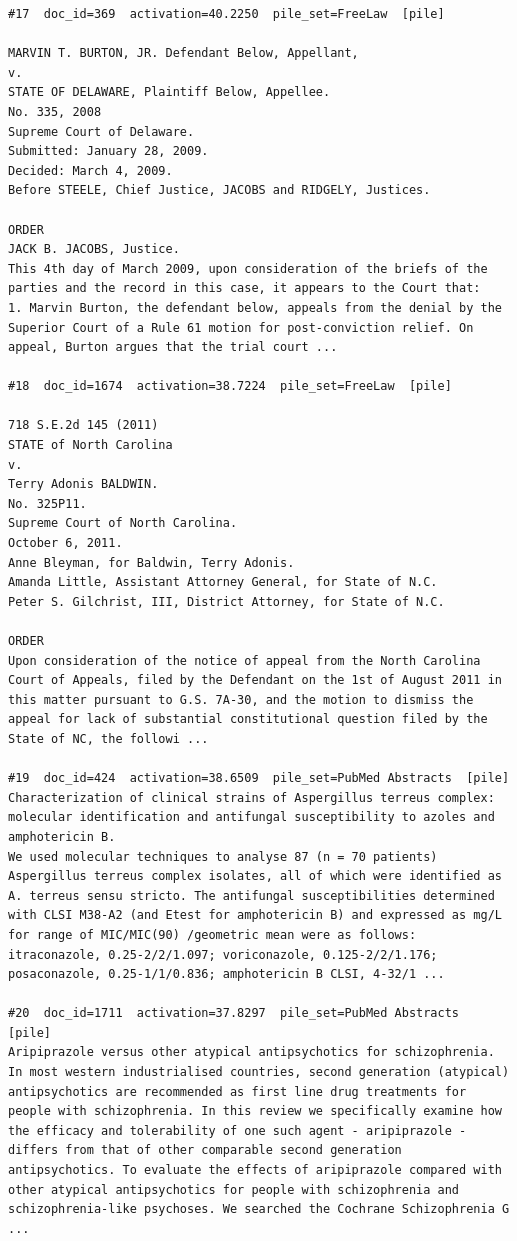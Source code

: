\begin{verbatim}
#17  doc_id=369  activation=40.2250  pile_set=FreeLaw  [pile]

MARVIN T. BURTON, JR. Defendant Below, Appellant,
v.
STATE OF DELAWARE, Plaintiff Below, Appellee.
No. 335, 2008
Supreme Court of Delaware.
Submitted: January 28, 2009.
Decided: March 4, 2009.
Before STEELE, Chief Justice, JACOBS and RIDGELY, Justices.

ORDER
JACK B. JACOBS, Justice.
This 4th day of March 2009, upon consideration of the briefs of the parties and the record in this case, it appears to the Court that:
1. Marvin Burton, the defendant below, appeals from the denial by the Superior Court of a Rule 61 motion for post-conviction relief. On appeal, Burton argues that the trial court ...

#18  doc_id=1674  activation=38.7224  pile_set=FreeLaw  [pile]

718 S.E.2d 145 (2011)
STATE of North Carolina
v.
Terry Adonis BALDWIN.
No. 325P11.
Supreme Court of North Carolina.
October 6, 2011.
Anne Bleyman, for Baldwin, Terry Adonis.
Amanda Little, Assistant Attorney General, for State of N.C.
Peter S. Gilchrist, III, District Attorney, for State of N.C.

ORDER
Upon consideration of the notice of appeal from the North Carolina Court of Appeals, filed by the Defendant on the 1st of August 2011 in this matter pursuant to G.S. 7A-30, and the motion to dismiss the appeal for lack of substantial constitutional question filed by the State of NC, the followi ...

#19  doc_id=424  activation=38.6509  pile_set=PubMed Abstracts  [pile]
Characterization of clinical strains of Aspergillus terreus complex: molecular identification and antifungal susceptibility to azoles and amphotericin B.
We used molecular techniques to analyse 87 (n = 70 patients) Aspergillus terreus complex isolates, all of which were identified as A. terreus sensu stricto. The antifungal susceptibilities determined with CLSI M38-A2 (and Etest for amphotericin B) and expressed as mg/L for range of MIC/MIC(90) /geometric mean were as follows: itraconazole, 0.25-2/2/1.097; voriconazole, 0.125-2/2/1.176; posaconazole, 0.25-1/1/0.836; amphotericin B CLSI, 4-32/1 ...

#20  doc_id=1711  activation=37.8297  pile_set=PubMed Abstracts  [pile]
Aripiprazole versus other atypical antipsychotics for schizophrenia.
In most western industrialised countries, second generation (atypical) antipsychotics are recommended as first line drug treatments for people with schizophrenia. In this review we specifically examine how the efficacy and tolerability of one such agent - aripiprazole - differs from that of other comparable second generation antipsychotics. To evaluate the effects of aripiprazole compared with other atypical antipsychotics for people with schizophrenia and schizophrenia-like psychoses. We searched the Cochrane Schizophrenia G ...

\end{verbatim}

